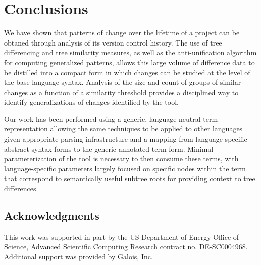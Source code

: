 \section{Conclusions}

We have shown that patterns of change over the lifetime of a project can
be obtaned through analysis of its version control history.  The use of
tree differencing and tree similarity measures, as well as the anti-unification
algorithm for computing generalized patterns, allows this large volume of difference data to be distilled into a compact form in which changes can be
studied at the level of the base language syntax.  Analysis of the size and
count of groups of similar changes as a function of a similarity threshold
provides a disciplined way to identify generalizations of changes identified by
the tool.

Our work has been performed using a generic, language neutral term
representation allowing the same techniques to be applied to other languages
given appropriate parsing infrastructure and a mapping from language-specific
abstract syntax forms to the generic annotated term form.  Minimal
parameterization of the tool is necessary to then consume these terms, with
language-specific parameters largely focused on specific nodes within the term
that correspond to semantically useful subtree roots for providing context to
tree differences.

\subsection{Acknowledgments}

This work was supported in part by the US Department of
Energy Office of Science, Advanced Scientific Computing Research
contract no. DE-SC0004968.  Additional support was provided by Galois,
Inc.
